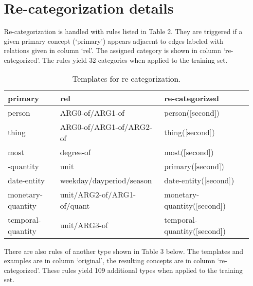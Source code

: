 \documentclass[11pt,a4paper]{article}
\begin{document}
\section{Re-categorization details}
Re-categorization is handled with rules listed in Table 2. They are triggered if a given primary concept (`primary') appears adjacent to edges labeled with relations given in column `rel'. The assigned category is shown in column `re-categorized'. The rules yield 32 categories when applied to the training set.

\begin{table*}[t!] \small 
    \begin{center} 
        \begin{tabular}{llll} 
            \hline  primary &  rel    &  re-categorized \\  \hline
            person &  ARG0-of/ARG1-of & person([second])\\
            thing &  ARG0-of/ARG1-of/ARG2-of & thing([second])\\
            most & degree-of &   most([second])\\
            -quantity & unit  &    primary([second])\\
            date-entity & weekday/dayperiod/season  &   date-entity([second])\\
            monetary-quantity & unit/ARG2-of/ARG1-of/quant  &   monetary-quantity([second])\\
            temporal-quantity & unit/ARG3-of  &    temporal-quantity([second])\\
            \hline
        \end{tabular}
    \end{center}
	\caption{\label{table:templates} Templates for re-categorization.}
\end{table*}

There are also rules of another type shown in Table 3 below. The templates and examples are in column `original', the resulting concepts are in column `re-categorized'. These rules yield 109 additional types when applied to the training set.
\end{document}
